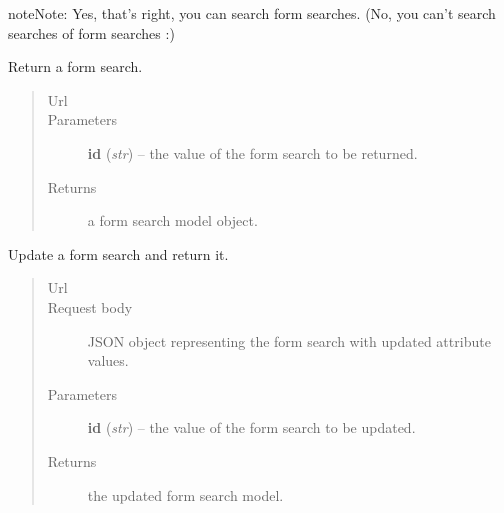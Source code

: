 \documentclass[letterpaper,10pt,english]{sphinxmanual}
\begin{document}
\begin{fulllineitems}
\begin{fulllineitems}
\begin{notice}{note}{Note:}
Yes, that's right, you can search form searches.  (No, you can't
search searches of form searches :)
\end{notice}

\end{fulllineitems}


\begin{fulllineitems}
\label{api:onlinelinguisticdatabase.controllers.formsearches.FormsearchesController.show}
Return a form search.
\begin{quote}\begin{description}
\item[{Url }] \leavevmode
{}

\item[{Parameters}] \leavevmode
\textbf{id} (\emph{str}) -- the  value of the form search to be returned.

\item[{Returns}] \leavevmode
a form search model object.

\end{description}\end{quote}

\end{fulllineitems}


\begin{fulllineitems}
\label{api:onlinelinguisticdatabase.controllers.formsearches.FormsearchesController.update}
Update a form search and return it.
\begin{quote}\begin{description}
\item[{Url }] \leavevmode
{}

\item[{Request body}] \leavevmode
JSON object representing the form search with updated
attribute values.

\item[{Parameters}] \leavevmode
\textbf{id} (\emph{str}) -- the  value of the form search to be updated.

\item[{Returns}] \leavevmode
the updated form search model.

\end{description}\end{quote}

\end{fulllineitems}


\end{fulllineitems}
\end{document}
